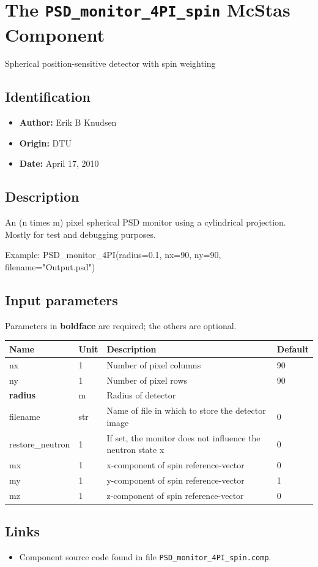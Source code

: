 \section{The \texttt{PSD\_monitor\_4PI\_spin} McStas Component}
Spherical position-sensitive detector with spin weighting

\subsection*{Identification}
\begin{itemize}
  \item \textbf{Author:} Erik B Knudsen
  \item \textbf{Origin:} DTU
  \item \textbf{Date:} April 17, 2010
\end{itemize}

\subsection*{Description}
An (n times m) pixel spherical PSD monitor using a cylindrical projection. Mostly for test and debugging purposes.

Example: PSD\_monitor\_4PI(radius=0.1, nx=90, ny=90, filename="Output.psd")

\subsection*{Input parameters}
Parameters in \textbf{boldface} are required; the others are optional.

\begin{longtable}{p{}p{}p{}p{}}
\toprule
\textbf{Name} & \textbf{Unit} & \textbf{Description} & \textbf{Default} \\
\midrule
\endhead
nx & 1 & Number of pixel columns & 90 \\
ny & 1 & Number of pixel rows & 90 \\
\textbf{radius} & m & Radius of detector &  \\
filename & str & Name of file in which to store the detector image & 0 \\
restore\_neutron & 1 & If set, the monitor does not influence the neutron state x & 0 \\
mx & 1 & x-component of spin reference-vector & 0 \\
my & 1 & y-component of spin reference-vector & 1 \\
mz & 1 & z-component of spin reference-vector & 0 \\
\bottomrule
\end{longtable}

\subsection*{Links}
\begin{itemize}
  \item Component source code found in file \texttt{PSD\_monitor\_4PI\_spin.comp}.
\end{itemize}
